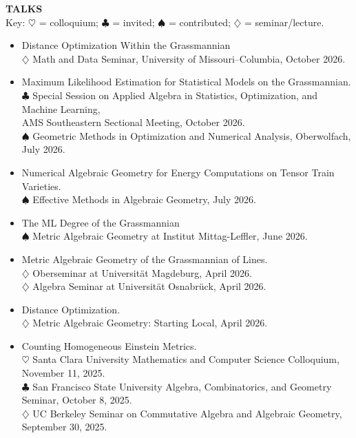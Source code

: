\documentclass[11pt]{article}
\newcommand{\hdr}[1]{\textcolor{blue(ryb)}{\textbf{#1}}}
\begin{document}
\bigskip

\hdr{TALKS}\\
Key: $\heartsuit$ = colloquium; $\clubsuit$ = invited; $\spadesuit$ = contributed; $\diamondsuit$ = seminar/lecture.
\begin{itemize}
\item Distance Optimization Within the Grassmannian\\
    $\diamondsuit$   Math and Data Seminar, University of Missouri--Columbia, October 2026.\\
\item Maximum Likelihood Estimation for Statistical Models on the Grassmannian. \\
  $\clubsuit$ Special Session on Applied Algebra in Statistics, Optimization, and Machine Learning,\\
  \hspace{20 em} AMS Southeastern Sectional Meeting, October 2026.\\
  $\spadesuit$   Geometric Methods in Optimization and Numerical Analysis, Oberwolfach, July 2026.
\item Numerical Algebraic Geometry for Energy Computations on Tensor Train Varieties.\\
  $\spadesuit$ Effective Methods in Algebraic Geometry, July 2026.
\item The ML Degree of the Grassmannian\\
  $\spadesuit$ Metric Algebraic Geometry at Institut Mittag-Leffler, June 2026. 
\item Metric Algebraic Geometry of the Grassmannian of Lines.\\
  $\diamondsuit$ Oberseminar at Universität Magdeburg, April 2026.\\
  $\diamondsuit$ Algebra Seminar at Universität Osnabrück, April 2026.
\item Distance Optimization.\\
  $\diamondsuit$ Metric Algebraic Geometry: Starting Local, April 2026. 
\item Counting Homogeneous Einstein Metrics.\\
  $\heartsuit$ Santa Clara University Mathematics and Computer Science Colloquium, November 11, 2025. \\
  $\clubsuit$ San Francisco State University Algebra, Combinatorics, and Geometry Seminar, October 8, 2025.\\
  $\diamondsuit$ UC Berkeley Seminar on Commutative Algebra and Algebraic Geometry, September 30, 2025. \\

\end{itemize}
\end{document}
